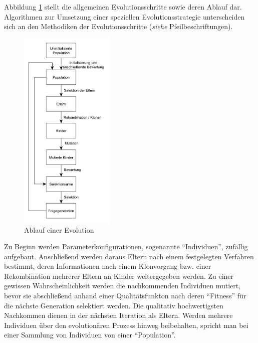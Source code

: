Abbildung \ref{fig:ablauf_einer_evolution} stellt die allgemeinen Evolutionsschritte sowie deren Ablauf dar.
Algorithmen zur Umsetzung einer speziellen Evolutionsstrategie unterscheiden sich an den Methodiken der Evolutionsschritte (\textit{siehe} Pfeilbeschriftungen).

\begin{figure}[H]
\centering
\includegraphics[width=0.4\textwidth]{img/ablauf_einer_evolution.pdf}
\caption[Ablauf einer Evolution]{Ablauf einer Evolution\protect\footnotemark}
\label{fig:ablauf_einer_evolution}
\end{figure}

\pagebreak

Zu Beginn werden Parameterkonfigurationen, sogenannte \enquote{Individuen}, zufällig aufgebaut.
Anschließend werden daraus Eltern nach einem festgelegten Verfahren bestimmt, deren Informationen nach einem Klonvorgang bzw. einer Rekombination mehrerer Eltern an Kinder weitergegeben werden.
Zu einer gewissen Wahrscheinlichkeit werden die nachkommenden Individuen mutiert, bevor sie abschließend anhand einer Qualitätsfunkton nach deren \enquote{Fitness} für die nächste Generation selektiert werden.
Die qualitativ hochwertigsten Nachkommen dienen in der nächsten Iteration als Eltern.
Werden mehrere Individuen über den evolutionären Prozess hinweg beibehalten, spricht man bei einer Sammlung von Individuen von einer \enquote{Population}.

